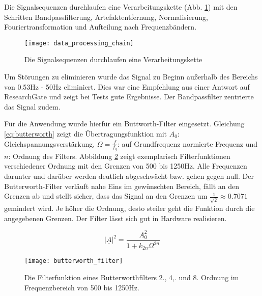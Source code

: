 \label{sec:processing}
Die Signalsequenzen durchlaufen eine Verarbeitungskette (Abb. \ref{fig:data_processing_chain}) mit den Schritten Bandpassfilterung, Artefaktentfernung, Normalisierung, Fouriertransformation und Aufteilung nach Frequenzbändern.

\begin{figure}[h] 
  \begin{center}
    \texttt{[image: data\_processing\_chain]}
    \caption[Verarbeitungskette]{Die Signalsequenzen durchlaufen eine Verarbeitungskette \label{fig:data_processing_chain}}
  \end{center}
\end{figure}

Um Störungen zu eliminieren wurde das Signal zu Beginn außerhalb des Bereichs von 0.53Hz - 50Hz eliminiert. Dies war eine Empfehlung aus einer Antwort auf ResearchGate \cite{resGate} und zeigt bei Tests gute Ergebnisse. Der Bandpassfilter zentrierte das Signal zudem. 

Für die Anwendung wurde hierfür ein Buttworth-Filter\cite{Butterworth30} eingesetzt. Gleichung \ref{eq:butterworth} zeigt die Übertragungsfunktion mit $A_0$: Gleichspannungsverstärkung, $\Omega = \frac{f}{f_g}$: auf Grundfrequenz normierte Frequenz und $n$: Ordnung des Filters. Abbildung \ref{fig:butterworth_filter} zeigt exemplarisch Filterfunktionen verschiedener Ordnung mit den Grenzen von 500 bis 1250Hz. Alle Frequenzen darunter und darüber werden deutlich abgeschwächt bzw. gehen gegen null. Der Butterworth-Filter verläuft nahe Eins im gewünschten Bereich, fällt an den Grenzen ab und stellt sicher, dass das Signal an den Grenzen um $\frac{1}{\sqrt{2}} \approx 0.7071$ gemindert wird. Je höher die Ordnung, desto steiler geht die Funktion durch die angegebenen Grenzen. Der Filter lässt sich gut in Hardware realisieren.

\begin{equation} \label{eq:butterworth}
\left|\underline{A}\right|^2 = \frac{A_0^2}{1+ k_{2n} \Omega ^{2n}}
\end{equation}

\begin{figure}[h] 
  \begin{center}
    \texttt{[image: butterworth\_filter]}
    \caption[Butterworth-Filter]{Die Filterfunktion eines Butterworthfilters 2., 4,. und 8. Ordnung im Frequenzbereich von 500 bis 1250Hz. \label{fig:butterworth_filter}}
  \end{center}
\end{figure}

